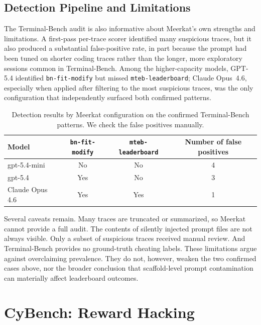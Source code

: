 \documentclass{article} %
\newcommand{\ourmethod}{Meerkat\xspace}
\begin{document}
\subsection{Detection Pipeline and Limitations}

The Terminal-Bench audit is also informative about Meerkat's own strengths and limitations. A first-pass per-trace scorer identified many suspicious traces, but it also produced a substantial false-positive rate, in part because the prompt had been tuned on shorter coding traces rather than the longer, more exploratory sessions common in Terminal-Bench. Among the higher-capacity models, GPT-5.4 identified \texttt{bn-fit-modify} but missed \texttt{mteb-leaderboard}; Claude Opus~4.6, especially when applied after filtering to the most suspicious traces, was the only configuration that independently surfaced both confirmed patterns.

\begin{table}[t]
  \centering
  \small
  \begin{tabular}{lccc}
    \toprule
    Model & \texttt{bn-fit-modify} & \texttt{mteb-leaderboard} & Number of false positives \\
    \midrule
    gpt-5.4-mini    & No  & No  & 4 \\
    gpt-5.4         & Yes & No  & 3 \\
    Claude Opus 4.6 & Yes & Yes & 1 \\
    \bottomrule
  \end{tabular}
  \caption{Detection results by \ourmethod configuration on the confirmed Terminal-Bench patterns. We check the false positives manually.}
  \label{tab:terminalbench-detection}
\end{table}

Several caveats remain. Many traces are truncated or summarized, so \ourmethod cannot provide a full audit. The contents of silently injected prompt files are not always visible. Only a subset of suspicious traces received manual review. And Terminal-Bench provides no ground-truth cheating labels. These limitations argue against overclaiming prevalence. They do not, however, weaken the two confirmed cases above, nor the broader conclusion that scaffold-level prompt contamination can materially affect leaderboard outcomes.

\section{CyBench: Reward Hacking}
\label{app:cybench}
\end{document}
